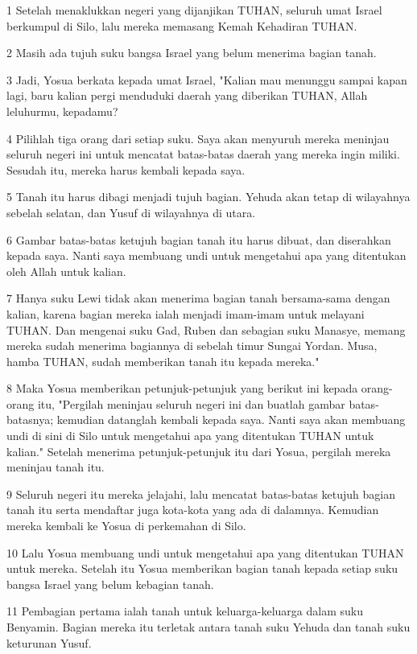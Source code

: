 \par 1 Setelah menaklukkan negeri yang dijanjikan TUHAN, seluruh umat Israel berkumpul di Silo, lalu mereka memasang Kemah Kehadiran TUHAN.
\par 2 Masih ada tujuh suku bangsa Israel yang belum menerima bagian tanah.
\par 3 Jadi, Yosua berkata kepada umat Israel, "Kalian mau menunggu sampai kapan lagi, baru kalian pergi menduduki daerah yang diberikan TUHAN, Allah leluhurmu, kepadamu?
\par 4 Pilihlah tiga orang dari setiap suku. Saya akan menyuruh mereka meninjau seluruh negeri ini untuk mencatat batas-batas daerah yang mereka ingin miliki. Sesudah itu, mereka harus kembali kepada saya.
\par 5 Tanah itu harus dibagi menjadi tujuh bagian. Yehuda akan tetap di wilayahnya sebelah selatan, dan Yusuf di wilayahnya di utara.
\par 6 Gambar batas-batas ketujuh bagian tanah itu harus dibuat, dan diserahkan kepada saya. Nanti saya membuang undi untuk mengetahui apa yang ditentukan oleh Allah untuk kalian.
\par 7 Hanya suku Lewi tidak akan menerima bagian tanah bersama-sama dengan kalian, karena bagian mereka ialah menjadi imam-imam untuk melayani TUHAN. Dan mengenai suku Gad, Ruben dan sebagian suku Manasye, memang mereka sudah menerima bagiannya di sebelah timur Sungai Yordan. Musa, hamba TUHAN, sudah memberikan tanah itu kepada mereka."
\par 8 Maka Yosua memberikan petunjuk-petunjuk yang berikut ini kepada orang-orang itu, "Pergilah meninjau seluruh negeri ini dan buatlah gambar batas-batasnya; kemudian datanglah kembali kepada saya. Nanti saya akan membuang undi di sini di Silo untuk mengetahui apa yang ditentukan TUHAN untuk kalian." Setelah menerima petunjuk-petunjuk itu dari Yosua, pergilah mereka meninjau tanah itu.
\par 9 Seluruh negeri itu mereka jelajahi, lalu mencatat batas-batas ketujuh bagian tanah itu serta mendaftar juga kota-kota yang ada di dalamnya. Kemudian mereka kembali ke Yosua di perkemahan di Silo.
\par 10 Lalu Yosua membuang undi untuk mengetahui apa yang ditentukan TUHAN untuk mereka. Setelah itu Yosua memberikan bagian tanah kepada setiap suku bangsa Israel yang belum kebagian tanah.
\par 11 Pembagian pertama ialah tanah untuk keluarga-keluarga dalam suku Benyamin. Bagian mereka itu terletak antara tanah suku Yehuda dan tanah suku keturunan Yusuf.
